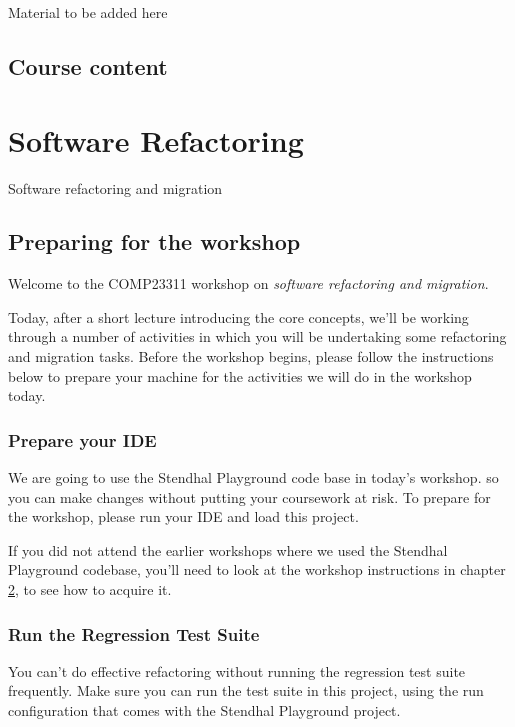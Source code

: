 \documentclass[
]{book}
\begin{document}
Material to be added here

\hypertarget{course-content-2}{%
\section{Course content}\label{course-content-2}}

\hypertarget{refactoring}{%
\chapter{Software Refactoring}\label{refactoring}}

Software refactoring and migration

\hypertarget{gitprep}{%
\section{Preparing for the workshop}\label{gitprep}}

Welcome to the COMP23311 workshop on \emph{software refactoring and migration}.

Today, after a short lecture introducing the core concepts, we'll be working through a number of activities in which you will be undertaking some refactoring and migration tasks. Before the workshop begins, please follow the instructions below to prepare your machine for the activities we will do in the workshop today.

\hypertarget{prepide}{%
\subsection{Prepare your IDE}\label{prepide}}

We are going to use the Stendhal Playground code base in today's workshop. so you can make changes without putting your coursework at risk. To prepare for the workshop, please run your IDE and load this project.

If you did not attend the earlier workshops where we used the Stendhal Playground codebase, you'll need to look at the workshop instructions in chapter \ref{refactoring}, to see how to acquire it.

\hypertarget{testsuite}{%
\subsection{Run the Regression Test Suite}\label{testsuite}}

You can't do effective refactoring without running the regression test suite frequently. Make sure you can run the test suite in this project, using the run configuration that comes with the Stendhal Playground project.
\end{document}
